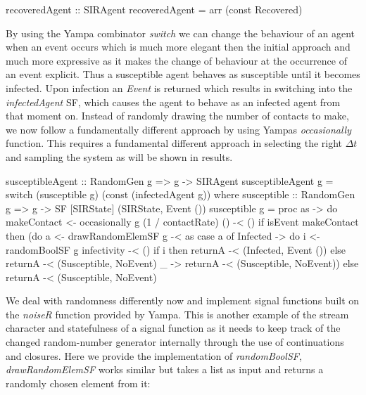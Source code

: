 \begin{HaskellCode}
recoveredAgent :: SIRAgent
recoveredAgent = arr (const Recovered)
\end{HaskellCode}

By using the Yampa combinator \textit{switch} we can change the behaviour of an agent when an event occurs which is much more elegant then the initial approach and much more expressive as it makes the change of behaviour at the occurrence of an event explicit. Thus a susceptible agent behaves as susceptible until it becomes infected. Upon infection an \textit{Event} is returned which results in switching into the \textit{infectedAgent} SF, which causes the agent to behave as an infected agent from that moment on. Instead of randomly drawing the number of contacts to make, we now follow a fundamentally different approach by using Yampas \textit{occasionally} function. This requires a fundamental different approach in selecting the right $\Delta t$ and sampling the system as will be shown in results. 

\begin{HaskellCode}
susceptibleAgent :: RandomGen g => g -> SIRAgent
susceptibleAgent g = switch (susceptible g) (const (infectedAgent g))
  where
    susceptible :: RandomGen g => g -> SF [SIRState] (SIRState, Event ())
    susceptible g = proc as -> do
      makeContact <- occasionally g (1 / contactRate) () -< ()
      if isEvent makeContact
        then (do
          a <- drawRandomElemSF g -< as
          case a of
            Infected -> do
              i <- randomBoolSF g infectivity -< ()
              if i
                then returnA -< (Infected, Event ())
                else returnA -< (Susceptible, NoEvent)
             _       -> returnA -< (Susceptible, NoEvent))
        else returnA -< (Susceptible, NoEvent)
\end{HaskellCode}

We deal with randomness differently now and implement signal functions built on the \textit{noiseR} function provided by Yampa. This is another example of the stream character and statefulness of a signal function as it needs to keep track of the changed random-number generator internally through the use of continuations and closures. Here we provide the implementation of \textit{randomBoolSF}, \textit{drawRandomElemSF} works similar but takes a list as input and returns a randomly chosen element from it:


